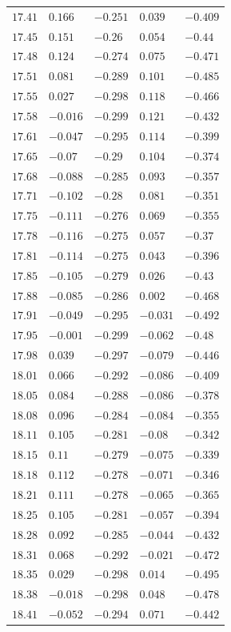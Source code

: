 \begin{table}[h]
\begin{tabular}{rllll}
$17.41$&$0.166$&$-0.251$&$0.039$&$-0.409$\\
$17.45$&$0.151$&$-0.26$&$0.054$&$-0.44$\\
$17.48$&$0.124$&$-0.274$&$0.075$&$-0.471$\\
$17.51$&$0.081$&$-0.289$&$0.101$&$-0.485$\\
$17.55$&$0.027$&$-0.298$&$0.118$&$-0.466$\\
$17.58$&$-0.016$&$-0.299$&$0.121$&$-0.432$\\
$17.61$&$-0.047$&$-0.295$&$0.114$&$-0.399$\\
$17.65$&$-0.07$&$-0.29$&$0.104$&$-0.374$\\
$17.68$&$-0.088$&$-0.285$&$0.093$&$-0.357$\\
$17.71$&$-0.102$&$-0.28$&$0.081$&$-0.351$\\
$17.75$&$-0.111$&$-0.276$&$0.069$&$-0.355$\\
$17.78$&$-0.116$&$-0.275$&$0.057$&$-0.37$\\
$17.81$&$-0.114$&$-0.275$&$0.043$&$-0.396$\\
$17.85$&$-0.105$&$-0.279$&$0.026$&$-0.43$\\
$17.88$&$-0.085$&$-0.286$&$0.002$&$-0.468$\\
$17.91$&$-0.049$&$-0.295$&$-0.031$&$-0.492$\\
$17.95$&$-0.001$&$-0.299$&$-0.062$&$-0.48$\\
$17.98$&$0.039$&$-0.297$&$-0.079$&$-0.446$\\
$18.01$&$0.066$&$-0.292$&$-0.086$&$-0.409$\\
$18.05$&$0.084$&$-0.288$&$-0.086$&$-0.378$\\
$18.08$&$0.096$&$-0.284$&$-0.084$&$-0.355$\\
$18.11$&$0.105$&$-0.281$&$-0.08$&$-0.342$\\
$18.15$&$0.11$&$-0.279$&$-0.075$&$-0.339$\\
$18.18$&$0.112$&$-0.278$&$-0.071$&$-0.346$\\
$18.21$&$0.111$&$-0.278$&$-0.065$&$-0.365$\\
$18.25$&$0.105$&$-0.281$&$-0.057$&$-0.394$\\
$18.28$&$0.092$&$-0.285$&$-0.044$&$-0.432$\\
$18.31$&$0.068$&$-0.292$&$-0.021$&$-0.472$\\
$18.35$&$0.029$&$-0.298$&$0.014$&$-0.495$\\
$18.38$&$-0.018$&$-0.298$&$0.048$&$-0.478$\\
$18.41$&$-0.052$&$-0.294$&$0.071$&$-0.442$\\

\end{tabular}
\end{table}
